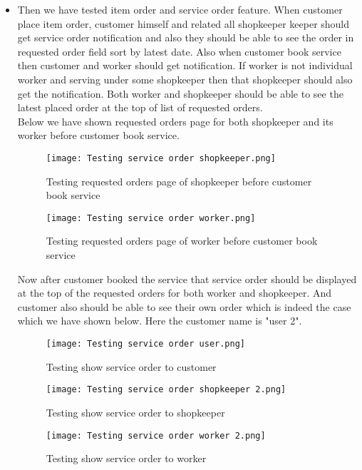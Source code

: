 \documentclass[conference]{IEEEtran}
\begin{document}
\begin{itemize}
    \vspace{0.5cm}
    \item Then we have tested item order and service order feature. When customer place item order, customer himself and related all shopkeeper keeper should get service order notification and also they should be able to see the order in requested order field sort by latest date. Also when customer book service then customer and worker should get notification. If worker is not individual worker and serving under some shopkeeper then that shopkeeper should also get the notification. Both worker and shopkeeper should be able to see the latest placed order at the top of list of requested orders. \\
    
    Below we have shown requested orders page for both shopkeeper and its worker before customer book service.
    \begin{figure}[H]
        \centering
        \texttt{[image: Testing service order shopkeeper.png]}
        \caption{Testing requested orders page of shopkeeper before customer book service}
        \label{fig:testServiceOrderShopkeeper}
    \end{figure}
    \begin{figure}[H]
        \centering
        \texttt{[image: Testing service order worker.png]}
        \caption{Testing requested orders page of worker before customer book service}
        \label{fig:testServiceOrderWorker}
    \end{figure}
    
    Now after customer booked the service that service order should be displayed at the top of the requested orders for both worker and shopkeeper. And customer also should be able to see their own order which is indeed the case which we have shown below. Here the customer name is "user 2".
    \begin{figure}[H]
        \centering
        \texttt{[image: Testing service order user.png]}
        \caption{Testing show service order to customer}
        \label{fig:testServiceOrderUser}
    \end{figure}
    \begin{figure}[H]
        \centering
        \texttt{[image: Testing service order shopkeeper 2.png]}
        \caption{Testing show service order to shopkeeper}
        \label{fig:testServiceOrderShopkeeper2}
    \end{figure}
    \begin{figure}[H]
        \centering
        \texttt{[image: Testing service order worker 2.png]}
        \caption{Testing show service order to worker}
        \label{fig:testServiceOrderWorker2}
    \end{figure}
    

\end{itemize}
\end{document}
